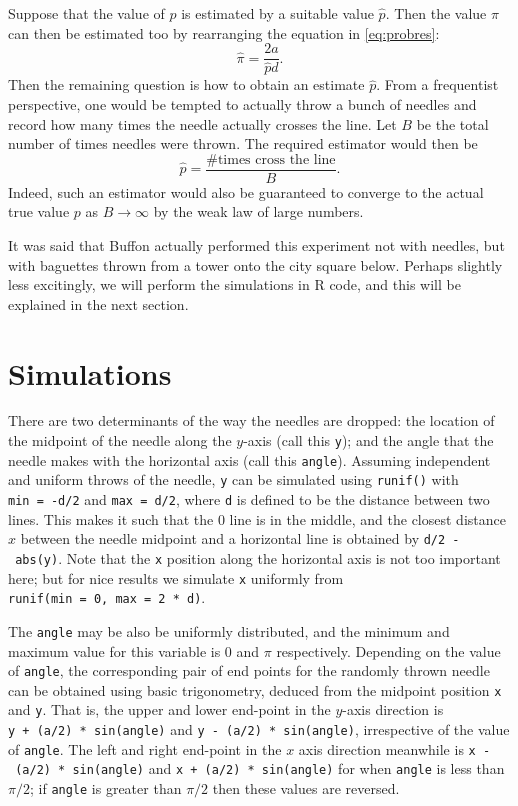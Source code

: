 \documentclass[11pt]{article}
\begin{document}
Suppose that the value of \(p\) is estimated by a suitable value
\(\hat p\). 
Then the value \(\pi\) can then be estimated too by rearranging the equation in \eqref{eq:probres}: 
\begin{equation}
\hat\pi = \frac{2a}{\hat p d}.
\end{equation} 
Then the remaining question is how to obtain an estimate \(\hat p\). 
From a frequentist perspective, one would be tempted to actually throw a bunch of needles and record how many times the needle actually crosses the line. 
Let \(B\) be the total number of times needles were thrown. 
The required estimator would then be 
\[
\hat p = \frac{\text{\# times cross the line}}{B}.
\] 
Indeed, such an estimator would also be guaranteed to converge to the actual true value \(p\) as \(B\to\infty\) by the weak law of large numbers.

It was said that Buffon actually performed this experiment not with needles, but with baguettes thrown from a tower onto the city square below. 
Perhaps slightly less excitingly, we will perform the simulations in R code, and this will be explained in the next section.

\section{Simulations}

There are two determinants of the way the needles are dropped: 
the location of the midpoint of the needle along the \(y\)-axis (call this
\texttt{y}); 
and the angle that the needle makes with the horizontal axis (call this \texttt{angle}). 
Assuming independent and uniform throws of the needle, \texttt{y} can be simulated using \texttt{runif()} with \texttt{min\ =\ -d/2} and \texttt{max\ =\ d/2}, where \texttt{d} is defined to be the distance between two lines. 
This makes it such that the 0 line is in the middle, and the closest distance \(x\) between the needle midpoint and a horizontal line is obtained by \texttt{d/2\ -\ abs(y)}. 
Note that the \texttt{x} position along the horizontal axis is not too important here; 
but for nice results we simulate \texttt{x} uniformly from \texttt{runif(min\ =\ 0,\ max\ =\ 2\ *\ d)}.

The \texttt{angle} may be also be uniformly distributed, and the minimum and maximum value for this variable is 0 and \(\pi\) respectively. 
Depending on the value of \texttt{angle}, the corresponding pair of end points for the randomly thrown needle can be obtained using basic trigonometry, deduced from the midpoint position \texttt{x} and \texttt{y}. 
That is, the upper and lower end-point in the \(y\)-axis direction is \texttt{y\ +\ (a/2)\ *\ sin(angle)} and \texttt{y\ -\ (a/2)\ *\ sin(angle)}, irrespective of the value of \texttt{angle}. 
The left and right end-point in the \(x\) axis direction meanwhile is \texttt{x\ -\ (a/2)\ *\ sin(angle)} and \texttt{x\ +\ (a/2)\ *\ sin(angle)} for when \texttt{angle} is less than \(\pi/2\); if \texttt{angle} is greater than \(\pi/2\) then these values are reversed.
\end{document}
